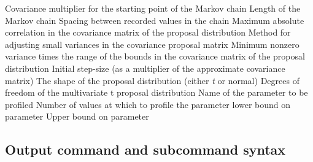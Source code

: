  {Covariance multiplier for the starting point of the Markov chain}
 {Length of the Markov chain}
 {Spacing between recorded values in the chain}
 {Maximum absolute correlation in the covariance matrix of the proposal distribution}
 {Method for adjusting small variances in the covariance proposal matrix}
 {Minimum nonzero variance times the range of the bounds in the covariance matrix of the proposal distribution}
 {Initial step-size (as a multiplier of the approximate covariance matrix)}
 {The shape of the proposal distribution (either \textit{t} or normal)}
 {Degrees of freedom of the multivariate t proposal distribution}
 {Name of the parameter to be profiled}
 {Number of values at which to profile the parameter}
 {lower bound on parameter}
 {Upper bound on parameter}
\subsection{Output command and subcommand syntax}
